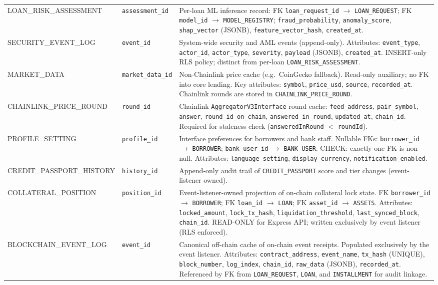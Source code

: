 \documentclass[12pt,a4paper]{report}
\begin{document}
\begin{table}[H]
\begin{tabular}{@{}p{2.6cm}p{3.4cm}p{7.0cm}@{}}
LOAN\_RISK\_ASSESSMENT & \texttt{assessment\_id} & Per-loan ML inference record: FK \texttt{loan\_request\_id} $\to$ \texttt{LOAN\_REQUEST}; FK \texttt{model\_id} $\to$ \texttt{MODEL\_REGISTRY}; \texttt{fraud\_probability}, \texttt{anomaly\_score}, \texttt{shap\_vector} (JSONB), \texttt{feature\_vector\_hash}, \texttt{created\_at}. \\
SECURITY\_EVENT\_LOG & \texttt{event\_id} & System-wide security and AML events (append-only). Attributes: \texttt{event\_type}, \texttt{actor\_id}, \texttt{actor\_type}, \texttt{severity}, \texttt{payload} (JSONB), \texttt{created\_at}. INSERT-only RLS policy; distinct from per-loan \texttt{LOAN\_RISK\_ASSESSMENT}. \\
MARKET\_DATA & \texttt{market\_data\_id} & Non-Chainlink price cache (e.g.\ CoinGecko fallback). Read-only auxiliary; no FK into core lending. Key attributes: \texttt{symbol}, \texttt{price\_usd}, \texttt{source}, \texttt{recorded\_at}. Chainlink rounds are stored in \texttt{CHAINLINK\_PRICE\_ROUND}. \\
CHAINLINK\_PRICE\_ROUND & \texttt{round\_id} & Chainlink \texttt{AggregatorV3Interface} round cache: \texttt{feed\_address}, \texttt{pair\_symbol}, \texttt{answer}, \texttt{round\_id\_on\_chain}, \texttt{answered\_in\_round}, \texttt{updated\_at}, \texttt{chain\_id}. Required for staleness check (\texttt{answeredInRound} $<$ \texttt{roundId}). \\
PROFILE\_SETTING & \texttt{profile\_id} & Interface preferences for borrowers and bank staff. Nullable FKs: \texttt{borrower\_id} $\to$ \texttt{BORROWER}; \texttt{bank\_user\_id} $\to$ \texttt{BANK\_USER}. CHECK: exactly one FK is non-null. Attributes: \texttt{language\_setting}, \texttt{display\_currency}, \texttt{notification\_enabled}. \\
CREDIT\_PASSPORT\_HISTORY & \texttt{history\_id} & Append-only audit trail of \texttt{CREDIT\_PASSPORT} score and tier changes (event-listener owned). \\
COLLATERAL\_POSITION & \texttt{position\_id} & Event-listener-owned projection of on-chain collateral lock state. FK \texttt{borrower\_id} $\to$ \texttt{BORROWER}; FK \texttt{loan\_id} $\to$ \texttt{LOAN}; FK \texttt{asset\_id} $\to$ \texttt{ASSETS}. Attributes: \texttt{locked\_amount}, \texttt{lock\_tx\_hash}, \texttt{liquidation\_threshold}, \texttt{last\_synced\_block}, \texttt{chain\_id}. READ-ONLY for Express API; written exclusively by event listener (RLS enforced). \\
BLOCKCHAIN\_EVENT\_LOG & \texttt{event\_id} & Canonical off-chain cache of on-chain event receipts. Populated exclusively by the event listener. Attributes: \texttt{contract\_address}, \texttt{event\_name}, \texttt{tx\_hash} (UNIQUE), \texttt{block\_number}, \texttt{log\_index}, \texttt{chain\_id}, \texttt{raw\_data} (JSONB), \texttt{recorded\_at}. Referenced by FK from \texttt{LOAN\_REQUEST}, \texttt{LOAN}, and \texttt{INSTALLMENT} for audit linkage. \\

\end{tabular}
\end{table}
\end{document}
